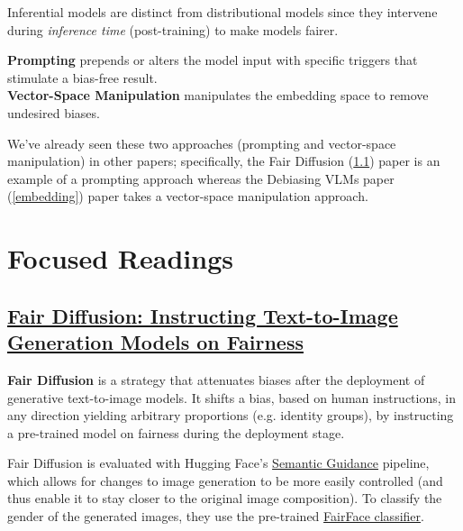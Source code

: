 \documentclass[12pt]{amsart}
\begin{document}
Inferential models are distinct from distributional models since they intervene during \textit{inference time} (post-training) to make models fairer.

\begin{definition}
\textbf{Prompting} prepends or alters the model input with specific triggers that stimulate a bias-free result. \\

\textbf{Vector-Space Manipulation} manipulates the embedding space to remove undesired biases.
\end{definition}

\begin{discussion*}
We've already seen these two approaches (prompting and vector-space manipulation) in other papers; specifically, the Fair Diffusion (\ref{fairdiffusion}) paper is an example of a prompting approach whereas the Debiasing VLMs paper (\ref{embedding}) paper takes a vector-space manipulation approach.
\end{discussion*}


\newpage

\section{Focused Readings}
\subsection{\href{https://arxiv.org/abs/2302.10893}{Fair Diffusion: Instructing Text-to-Image Generation Models on Fairness}}\label{fairdiffusion}

\begin{approach*}
\textbf{Fair Diffusion} is a strategy that attenuates biases after the deployment of generative text-to-image models. It shifts a bias, based on human instructions, in any direction yielding arbitrary proportions (e.g. identity groups), by instructing a pre-trained model on fairness during the deployment stage.
\end{approach*}

Fair Diffusion is evaluated with Hugging Face's \href{https://huggingface.co/docs/diffusers/api/pipelines/semantic_stable_diffusion}{Semantic Guidance} pipeline, which allows for changes to image generation to be more easily controlled (and thus enable it to stay closer to the original image composition). To classify the gender of the generated images, they use the pre-trained \href{https://arxiv.org/pdf/1908.04913.pdf}{FairFace classifier}.\\
\end{document}
